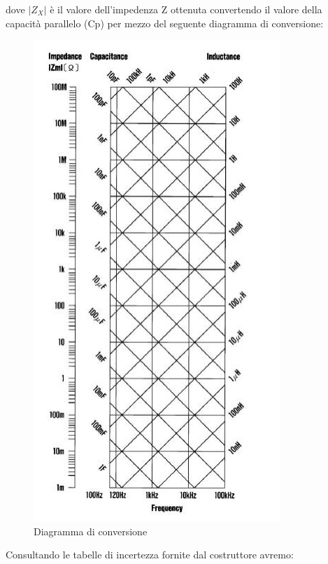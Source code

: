 dove $|Z_X|$ è il valore dell'impedenza Z ottenuta convertendo il valore della capacità parallelo (Cp) per mezzo del seguente diagramma di conversione:

\begin{figure}[H]
    \centering
    \includegraphics{media/diagramma_conversione_Cp.png}
    \caption{Diagramma di conversione}
    \label{fig:diag_conv_Cp}
\end{figure}
\FloatBarrier

Consultando le tabelle di incertezza fornite dal costruttore avremo:


